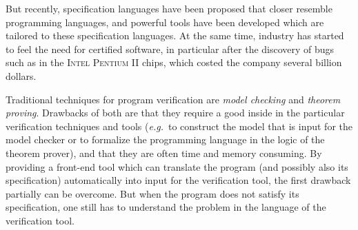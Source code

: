 \documentclass[a4paper]{llncs}
\begin{document}
But recently, specification languages have been proposed that closer
resemble programming languages, and powerful tools have been developed
which are tailored to these specification languages. At the same time,
industry has started to feel the need for certified software, in
particular after the discovery of bugs such as in the \textsc{Intel}
\textsc{Pentium II} chips, which costed the company several billion
dollars.



Traditional techniques for program verification are
\textit{model checking} and \textit{theorem proving}. 
Drawbacks of both are that they require a good inside in the
particular verification techniques and tools (\emph{e.g.}~to construct
the model that is input for the model checker or to formalize the
programming language in the logic of the theorem prover), and that
they are often time and memory consuming. By providing a front-end
tool which can translate the program (and possibly also its
specification) automatically into input for the verification tool, the
first drawback partially can be overcome. But when the program does
not satisfy its specification, one still has to understand the problem
in the language of the verification tool.


\end{document}
